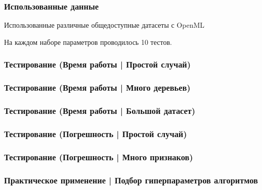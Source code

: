 \documentclass{beamer}
\begin{document}
\begin{frame} \frametitle{Использованные данные}
    Использованные различные общедоступные датасеты с OpenML

    \vfill
    \begin{center}
        
        \vfill
        На каждом наборе параметров проводилось 10 тестов.
    \end{center}
\end{frame}

\begin{frame} \frametitle{Тестирование (Время работы | Простой случай)}
    \begin{center}
        
    \end{center}
\end{frame}

\begin{frame} \frametitle{Тестирование (Время работы | Много деревьев)}
    \begin{center}
        
    \end{center}
\end{frame}

\begin{frame} \frametitle{Тестирование (Время работы | Большой датасет)}
    \begin{center}
        
    \end{center}
\end{frame}

\begin{frame} \frametitle{Тестирование (Погрешность | Простой случай)}
    \begin{center}
        
    \end{center}
\end{frame}

\begin{frame} \frametitle{Тестирование (Погрешность | Много признаков)}
    \begin{center}
        
    \end{center}
\end{frame}

\begin{frame} \frametitle{Практическое применение | Подбор гиперпараметров алгоритмов}
\end{frame}
\end{document}
